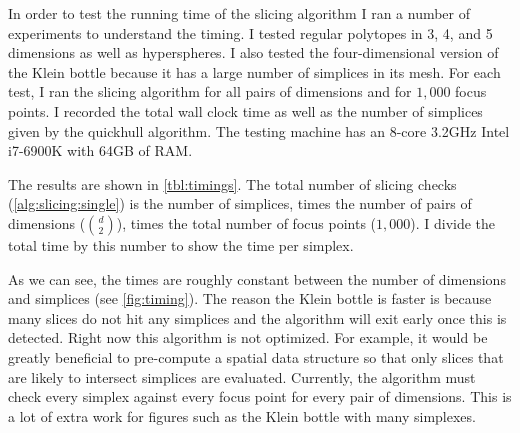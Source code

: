 In order to test the running time of the slicing algorithm I ran a number of
experiments to understand the timing. I tested regular polytopes in 3, 4, and
5 dimensions as well as hyperspheres. I also tested the four-dimensional
version of the Klein bottle because it has a large number of simplices in its
mesh. For each test, I ran the slicing algorithm for all pairs of dimensions
and for $1,000$ focus points. I recorded the total wall clock time as well as
the number of simplices given by the quickhull algorithm. The testing machine
has an 8-core 3.2GHz Intel i7-6900K with 64GB of RAM.

The results are shown in \autoref{tbl:timings}. The total number of slicing
checks (\autoref{alg:slicing:single}) is the number of simplices, times the
number of pairs of dimensions ($d \choose 2$), times the total number of focus
points ($1,000$). I divide the total time by this number to show the time per
simplex. 

As we can see, the times are roughly constant between the number of
dimensions and simplices (see \autoref{fig:timing}). The reason the Klein 
bottle is faster is because
many slices do not hit any simplices and the algorithm will exit early
once this is detected. Right now this algorithm is not optimized.
For example, it would be greatly beneficial to pre-compute a spatial data
structure so that only slices that are likely to intersect simplices are
evaluated. Currently, the algorithm must check every simplex against every
focus point for every pair of dimensions. This is a lot of extra work for figures
such as the Klein bottle with many simplexes.

